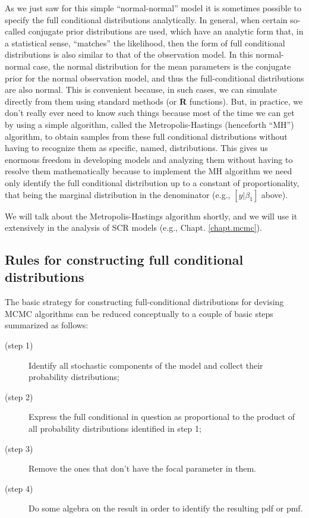 As we just saw for this simple ``normal-normal'' model it is sometimes
possible to specify the full conditional distributions
analytically. In general, when certain so-called conjugate prior
distributions are used, which have an analytic form that, in a
statistical
sense, ``matches'' the likelihood, then the form of full conditional distributions
is also similar to that of the observation model. In this normal-normal
case, the normal distribution for the mean parameters is the conjugate
prior for the normal observation model, and thus the full-conditional
distributions are also normal. This is convenient because, in such
cases, we can simulate directly from them using standard methods (or
{\bf R}
functions).  But, in practice, we don't really ever need to know such
things because most of the time we can get by using a simple
algorithm, called the Metropolis-Hastings (henceforth ``MH'')
algorithm, to obtain samples from these full conditional distributions
without having to recognize them as specific, named, distributions.
This gives us enormous freedom in developing models
and analyzing them without having to resolve them mathematically
because to implement the MH algorithm we need only identify the full
conditional distribution up to a constant of proportionality, that
being the marginal distribution in the denominator (e.g., $[y|\beta_1]$
above).

We will talk about the Metropolis-Hastings algorithm shortly, and we
will use it extensively in the analysis of SCR models (e.g., Chapt.
\ref{chapt.mcmc}).

\subsection{Rules for constructing full conditional distributions}
\label{glms.sec.rules}

The basic strategy for constructing full-conditional distributions for
devising MCMC algorithms can be reduced conceptually to a couple of
basic steps summarized as follows:

\begin{description}
\item[   (step 1)] Identify all stochastic components of the model and
  collect their probability distributions;
\item[   (step 2)] Express the full conditional in question
  as proportional to the product of all probability distributions
  identified in step 1;
\item[   (step 3)] Remove the ones that don't have the focal parameter in them.
\item[   (step 4)] Do some algebra on the result in order to identify the resulting pdf or pmf.
\end{description}

